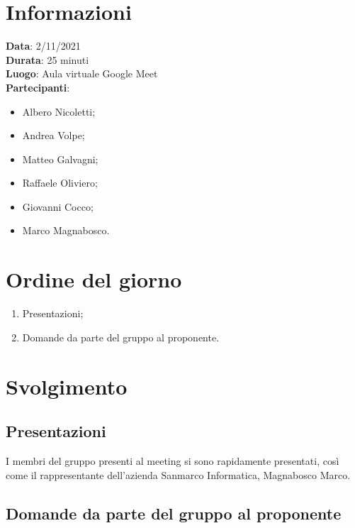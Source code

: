 \documentclass[a4paper, 12pt]{article}
\begin{document}
\makefrontpage

\section{Informazioni}
\textbf{Data}: 2/11/2021\\
\textbf{Durata}: 25 minuti\\
\textbf{Luogo}: Aula virtuale Google Meet\\
\textbf{Partecipanti}:
\begin{itemize}
	\item Albero Nicoletti;
	\item Andrea Volpe;
	\item Matteo Galvagni;
	\item Raffaele Oliviero;
    \item Giovanni Cocco;
    \item Marco Magnabosco.
\end{itemize}

\section{Ordine del giorno}
\begin{enumerate}
    \item Presentazioni;
    \item Domande da parte del gruppo al proponente.
\end{enumerate}

\section{Svolgimento}

\subsection{Presentazioni}
I membri del gruppo presenti al meeting si sono rapidamente presentati, così come il rappresentante dell'azienda Sanmarco Informatica, Magnabosco Marco.

\subsection{Domande da parte del gruppo al proponente}
\end{document}
